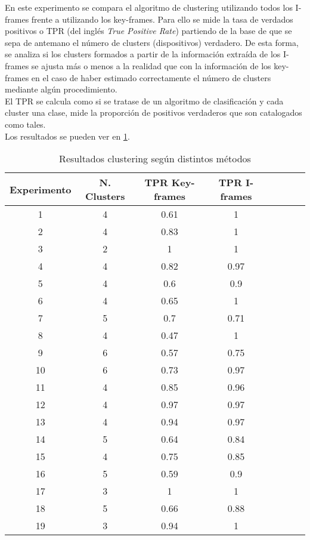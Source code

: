En este experimento se compara el algoritmo de clustering utilizando todos los I-frames frente a utilizando los key-frames. Para ello se mide la tasa de verdados positivos o TPR (del inglés \textit{True Positive Rate}) partiendo de la base de que se sepa de antemano el número de clusters (dispositivos) verdadero. De esta forma, se analiza si los clusters formados a partir de la información extraída de los I-frames se ajusta más o menos a la realidad que con la información de los key-frames en el caso de haber estimado correctamente el número de clusters mediante algún procedimiento. \\

El TPR se calcula como si se tratase de un algoritmo de clasificación y cada cluster una clase, mide la proporción de positivos verdaderos que son catalogados como tales. \\

Los resultados se pueden ver en \ref{tabla:resultados1}.

\begin{table}[!htb]
    \centering
        \begin{tabular}{| c | c || c | c | c | c | c | c |}
        \hline
        Experimento & N. Clusters & TPR Key-frames & TPR I-frames \\ \hline
        1 & 4 & 0.61 & 1 \\ \hline %
        2 & 4 & 0.83 & 1 \\ \hline %
        3 & 2 & 1 & 1 \\ \hline %
        4 & 4 & 0.82 & 0.97 \\ \hline %
        5 & 4 & 0.6 & 0.9 \\ \hline %
        6 & 4 & 0.65 & 1 \\ \hline %
        7 & 5 & 0.7 & 0.71 \\ \hline %
        8 & 4 & 0.47 & 1 \\ \hline %
        9 & 6 & 0.57 & 0.75 \\ \hline %
        10 & 6 & 0.73 & 0.97 \\ \hline %
        11 & 4 & 0.85 & 0.96 \\ \hline %
        12 & 4 & 0.97 & 0.97 \\ \hline %
        13 & 4 & 0.94 & 0.97 \\ \hline %
        14 & 5 & 0.64 & 0.84 \\ \hline %
        15 & 4 & 0.75 & 0.85 \\ \hline %
        16 & 5 & 0.59 & 0.9 \\ \hline %
        17 & 3 & 1 & 1 \\ \hline %
        18 & 5 & 0.66 & 0.88 \\ \hline %
        19 & 3 & 0.94 & 1 \\ \hline %
        \end{tabular}
    \caption{Resultados clustering según distintos métodos}
    \label{tabla:resultados1}
\end{table}

